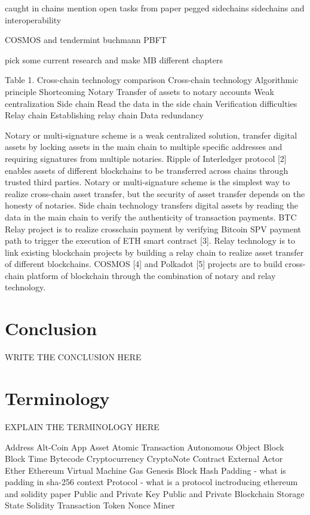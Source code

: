 caught in chains mention open tasks from paper \cite{borkowski2018caught}
pegged sidechains \cite{back2014enabling}
sidechains and interoperability \cite{johnson2019sidechains}



COSMOS \cite{kwon2018network} and tendermint \cite{kwon2014tendermint} buchmann \cite{buchman2016tendermint} PBFT \cite{castro1999practical}

pick some current research and make MB different chapters

Table 1. Cross-chain technology comparison
Cross-chain technology Algorithmic principle Shortcoming
Notary Transfer of assets to notary accounts Weak centralization
Side chain Read the data in the side chain Verification difficulties
Relay chain Establishing relay chain Data redundancy

Notary or multi-signature scheme is a weak centralized solution, transfer digital
assets by locking assets in the main chain to multiple specific addresses and requiring
signatures from multiple notaries. Ripple of Interledger protocol [2] enables assets of
different blockchains to be transferred across chains through trusted third parties. Notary
or multi-signature scheme is the simplest way to realize cross-chain asset transfer, but
the security of asset transfer depends on the honesty of notaries.
Side chain technology transfers digital assets by reading the data in the main chain
to verify the authenticity of transaction payments. BTC Relay project is to realize crosschain
payment by verifying Bitcoin SPV payment path to trigger the execution of ETH
smart contract [3].
Relay technology is to link existing blockchain projects by building a relay chain to
realize asset transfer of different blockchains. COSMOS [4] and Polkadot [5] projects
are to build cross-chain platform of blockchain through the combination of notary and
relay technology.

\chapter{Conclusion}
\label{ch:chapter07}
WRITE THE CONCLUSION HERE

\chapter{Terminology}
\label{ch:chapter08}
EXPLAIN THE TERMINOLOGY HERE

Address
Alt-Coin
App
Asset
Atomic Transaction
Autonomous Object
Block
Block Time
Bytecode
Cryptocurrency
CryptoNote
Contract 
External Actor
Ether
Ethereum Virtual Machine
Gas
Genesis Block
Hash
Padding - what is padding in sha-256 context
Protocol - what is a protocol inctroducing ethereum and solidity paper
Public and Private Key
Public and Private Blockchain
Storage State
Solidity
Transaction 
Token
Nonce
Miner








